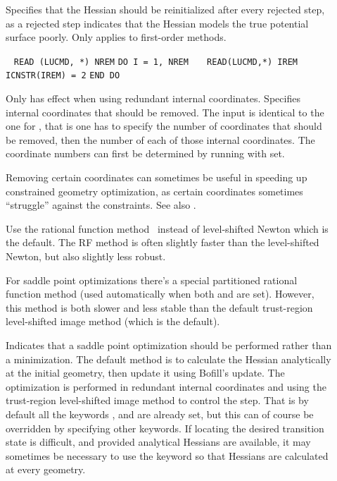 \begin{description}
\item[]
Specifies that the Hessian should be
reinitialized after every
rejected step, as a rejected step
indicates that the Hessian models the
true potential surface poorly. Only applies to first-order
methods.

\item[]\verb| |\newline
\verb|READ (LUCMD, *) NREM|\newline
\verb|DO I = 1, NREM|\newline
\verb|   READ(LUCMD,*) IREM|\newline
\verb|   ICNSTR(IREM) = 2|\newline
\verb|END DO|

Only has effect when using redundant internal coordinates.
Specifies internal coordinates that should be removed. The input is
identical to the one for , that is one has to specify
the number of coordinates that should be removed, then the number of
each of those internal coordinates. The coordinate numbers can first
be determined by running with  set.

Removing certain coordinates can sometimes be useful in speeding up
constrained geometry optimization, as certain coordinates sometimes
``struggle'' against the constraints. See also .

\item[]
Use the rational function method~\cite{abnajsrsjpc89} instead of
level-shifted Newton which is the default. The RF method is often
slightly faster than the level-shifted Newton, but also slightly less
robust.

For saddle point optimizations there's a special partitioned rational
function method (used automatically when both 
and  are set). However, this method is both slower and
less stable than the default trust-region level-shifted image method
(which is the default).

\item[]
Indicates that a saddle point optimization should be performed rather
than a minimization. The default method is to calculate the Hessian
analytically at the initial geometry, then update it using Bofill's
update. The optimization is performed in redundant internal
coordinates and using the trust-region level-shifted image method to
control the step. That is by default all the keywords ,
 and  are already set, but this can of course
be overridden by specifying other keywords. If locating the desired
transition state is difficult, and provided analytical Hessians are
available, it may sometimes be necessary to use the 
keyword so that Hessians are calculated at every geometry.


\end{description}
